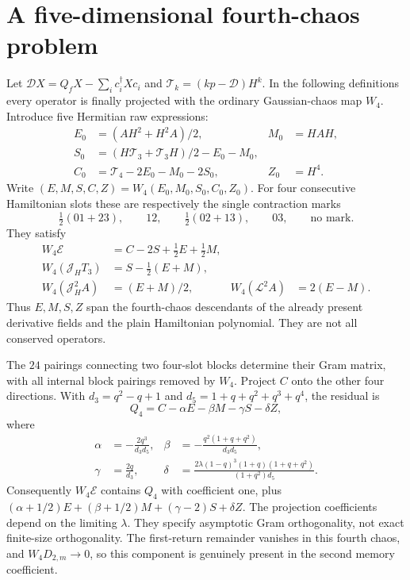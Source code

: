 \documentclass[11pt,a4paper]{article}
\begin{document}
\newpage
\section{A five-dimensional fourth-chaos problem}
Let $\mathscr D X=Q_fX-\sum_i c_i^\dagger Xc_i$ and
$\mathscr T_k=(kp-\mathscr D)H^k$. In the following definitions every
operator is finally projected with the ordinary Gaussian-chaos map
$W_4$. Introduce five Hermitian raw expressions:
\begin{align}
 E_0&=(AH^2+H^2A)/2,& M_0&=HAH,\\
 S_0&=(H\mathscr T_3+\mathscr T_3H)/2-E_0-M_0,\\
 C_0&=\mathscr T_4-2E_0-M_0-2S_0,& Z_0&=H^4.
\end{align}
Write $(E,M,S,C,Z)=W_4(E_0,M_0,S_0,C_0,Z_0)$.
For four consecutive Hamiltonian slots these are respectively the
single contraction marks
\begin{equation}
 \tfrac12(01+23),\qquad12,\qquad\tfrac12(02+13),
 \qquad03,\qquad\text{no mark}.
\end{equation}
They satisfy
\begin{align}
 W_4\mathcal E&=C-2S+\tfrac12E+\tfrac12M,\\
 W_4(\mathcal J_H T_3)&=S-\tfrac12(E+M),\\
 W_4(\mathcal J_H^2A)&=(E+M)/2,&
 W_4(\mathcal L^2A)&=2(E-M).
\end{align}
Thus $E,M,S,Z$ span the fourth-chaos descendants of the already
present derivative fields and the plain Hamiltonian polynomial.
They are not all conserved operators.

The $24$ pairings connecting two four-slot blocks determine their
Gram matrix, with all internal block pairings removed by $W_4$.
Project $C$ onto the other four directions. With
$d_3=q^2-q+1$ and $d_5=1+q+q^2+q^3+q^4$, the residual is
\begin{equation}\label{eq:Q4}
 Q_4=C-\alpha E-\beta M-\gamma S-\delta Z,
\end{equation}
where
\begin{align}
 \alpha&=-\frac{2q^3}{d_3d_5},&
 \beta&=-\frac{q^2(1+q+q^2)}{d_3d_5},\\
 \gamma&=\frac{2q}{d_3},&
 \delta&=\frac{2\lambda(1-q)^3(1+q)(1+q+q^2)}{(1+q^2)d_5}.
\end{align}
Consequently $W_4\mathcal E$ contains $Q_4$ with coefficient one,
plus $(\alpha+1/2)E+(\beta+1/2)M+(\gamma-2)S+\delta Z$.
The projection coefficients depend on the limiting $\lambda$.
They specify asymptotic Gram orthogonality, not exact finite-size
orthogonality. The first-return remainder vanishes in this fourth
chaos, and $W_4D_{2,m}\to0$, so this component is genuinely present
in the second memory coefficient.
\end{document}
